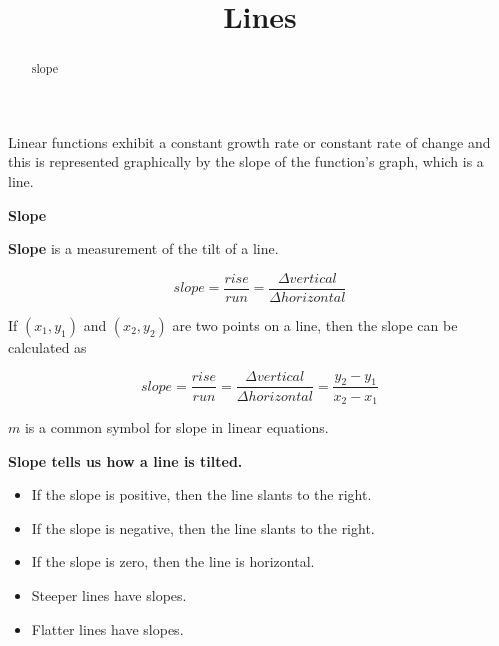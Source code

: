 \documentclass{ximera}
\title{Lines}
\begin{document}
\begin{abstract}
slope
\end{abstract}
\maketitle



Linear functions exhibit a constant growth rate or constant rate of change and this is represented graphically by the slope of the function's graph, which is a line.


\begin{definition} \textbf{\textcolor{green!50!black}{Slope}} 


\textbf{Slope} is a measurement of the tilt of a line.


\[
slope = \frac{rise}{run} = \frac{\Delta vertical}{\Delta horizontal}
\]


If $(x_1, y_1)$ and $(x_2, y_2)$ are two points on a line, then the slope can be calculated as

\[
slope = \frac{rise}{run} = \frac{\Delta vertical}{\Delta horizontal} = \frac{y_2 - y_1}{x_2 - x_1}
\]



\end{definition}


$m$ is a common symbol for slope in linear equations.




\begin{observation} \textbf{\textcolor{-red!75}{Slope tells us how a line is tilted.}}



\begin{itemize}
\item If the slope is positive, then the line slants   to the right.
\item If the slope is negative, then the line slants   to the right.
\item If the slope is zero, then the line is horizontal.
\end{itemize}


\begin{itemize}
\item Steeper lines have  slopes.
\item Flatter lines have  slopes.
\end{itemize}

\end{observation}
\end{document}
